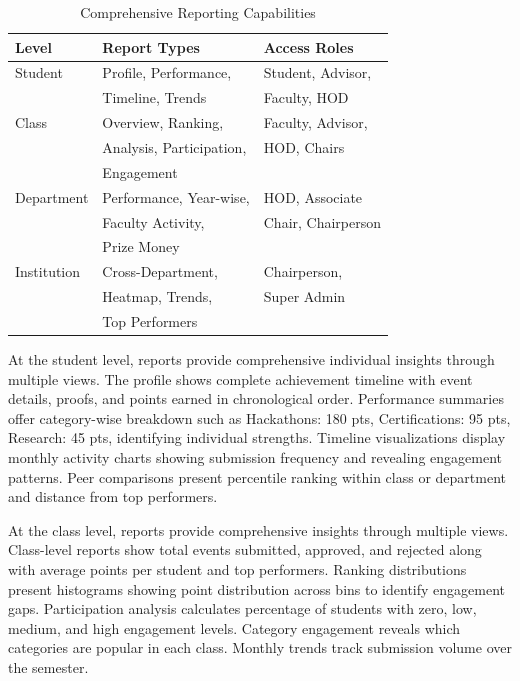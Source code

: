 \documentclass[conference]{IEEEtran}
\begin{document}
\begin{table}[t]
\centering
\caption{Comprehensive Reporting Capabilities}
\label{tab:reports}
\begin{tabular}{@{}lll@{}}
\toprule
\textbf{Level} & \textbf{Report Types} & \textbf{Access Roles} \\
\midrule
Student & Profile, Performance, & Student, Advisor, \\
 & Timeline, Trends & Faculty, HOD \\
\midrule
Class & Overview, Ranking, & Faculty, Advisor, \\
 & Analysis, Participation, & HOD, Chairs \\
 & Engagement & \\
\midrule
Department & Performance, Year-wise, & HOD, Associate \\
 & Faculty Activity, & Chair, Chairperson \\
 & Prize Money & \\
\midrule
Institution & Cross-Department, & Chairperson, \\
 & Heatmap, Trends, & Super Admin \\
 & Top Performers & \\
\bottomrule
\end{tabular}
\end{table}

At the student level, reports provide comprehensive individual insights through multiple views. The profile shows complete achievement timeline with event details, proofs, and points earned in chronological order. Performance summaries offer category-wise breakdown such as Hackathons: 180 pts, Certifications: 95 pts, Research: 45 pts, identifying individual strengths. Timeline visualizations display monthly activity charts showing submission frequency and revealing engagement patterns. Peer comparisons present percentile ranking within class or department and distance from top performers.

At the class level, reports provide comprehensive insights through multiple views. Class-level reports show total events submitted, approved, and rejected along with average points per student and top performers. Ranking distributions present histograms showing point distribution across bins to identify engagement gaps. Participation analysis calculates percentage of students with zero, low, medium, and high engagement levels. Category engagement reveals which categories are popular in each class. Monthly trends track submission volume over the semester.
\end{document}
